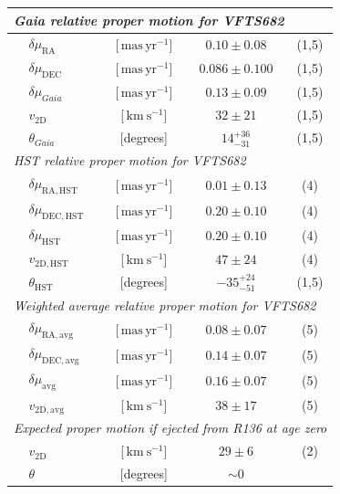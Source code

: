 \documentclass[a4paper,fleqn,usenatbib]{mnras}
\newcommand{\SdM}[1]{{{\color{brown}{#1}}}}
\newcommand{\kms}{{\,\mathrm{km\ s^{-1}}}}
\newcommand{\masyr}{\,\mathrm{mas}\,\mathrm{yr}^{-1}}
\begin{document}
\begin{table}
\begin{center}
\begin{tabular}{llc|c|c}
                


      \multicolumn{5}{l}{\emph{Gaia relative proper motion for VFTS682 }} \\
      \hline
      &$\delta\mu_\mathrm{RA}$  &[$\masyr$] & $0.10\pm0.08$ & (1,5) \\
      &$\delta\mu_\mathrm{DEC}$  &[$\masyr$] & $0.086\pm0.100$ &  (1,5) \\
      &$\delta\mu_{Gaia}$  &[$\masyr$] & $0.13\pm0.09$ &  (1,5) \\
      &$v_\mathrm{2D}$  &[$\kms$] & $32\pm21$ & (1,5)\\  
      &$\theta_{Gaia}$  &[degrees] &  $14_{-31}^{+36}$  & (1,5)\\  

 \hline     
      \multicolumn{5}{l}{\emph{HST relative proper motion for VFTS682}} \\
            \hline
      &$\delta\mu_\mathrm{RA, HST}$  &[$\masyr$] & $0.01\pm0.13$ & (4) \\
      &$\delta\mu_\mathrm{DEC, HST}$  &[$\masyr$] & $0.20\pm0.10$ &  (4) \\
       &$\delta\mu_\mathrm{HST}$  &[$\masyr$] & $0.20\pm0.10$ &  (4) \\
                  &$v_\mathrm{2D, HST}$  &[$\kms$] & $47\pm24$ & (4)\\  
                      &$\theta_\mathrm{HST}$  &[degrees] &   $-35_{-51}^{+24}$   & (1,5)\\  
      \hline
      \multicolumn{5}{l}{\emph{Weighted average relative proper motion
      for VFTS682}}\\
      \hline
      &$\delta\mu_\mathrm{RA, avg}$  &[$\masyr$] & $0.08\pm0.07$ & (5) \\
      &$\delta\mu_\mathrm{DEC, avg}$  &[$\masyr$] & $0.14\pm0.07$ &  (5) \\
       &$\delta\mu_\mathrm{avg}$  &[$\masyr$] & $0.16\pm0.07$ &  (5) \\
      &$v_\mathrm{2D, avg}$  &[$\kms$] & $38\pm17$ & (5)\\
      \hline
       \multicolumn{5}{l}{\emph{Expected proper motion if ejected from
      R136 at age zero}} \\
      \hline
      &$v_\mathrm{2D}$  &[$\kms$] & $29\pm 6$ & (2) \\  
      &$\theta$  &[degrees] &  $\sim0$  & \\ 
       \hline


\end{tabular}
\end{center}
\end{table}
\end{document}
